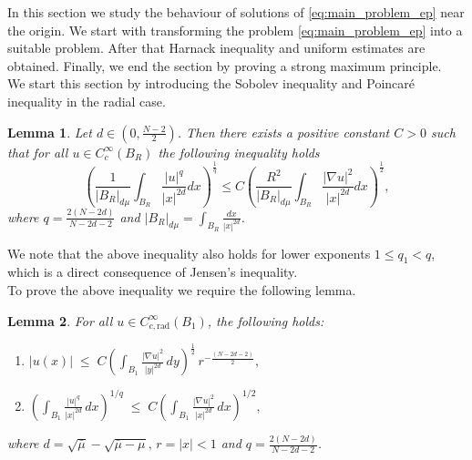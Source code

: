 \documentclass[11pt]{article}
\newtheorem{lemma}{Lemma}[section] %
\newcommand{\al} {\alpha}
\newcommand{\grad}{\nabla}
\begin{document}
In this section we study the behaviour of solutions of \eqref{eq:main_problem_ep} near the origin. We start with transforming the problem \eqref{eq:main_problem_ep} into a suitable problem. After that Harnack inequality and uniform estimates are obtained. Finally, we end the section by proving a strong maximum principle.\\
We start this section by introducing the Sobolev inequality and Poincar\'{e} inequality in the radial case.


\begin{lemma}\label{lem:weighted_sobolev_inequality}
Let $d \in  (0, \frac{N-2}{2})$. Then there exists a positive constant $C>0$ such that for all $u \in C_c^{\infty}(B_R)$ the following inequality holds
\begin{equation*}
        \left( \frac{1}{|B_R|_{d\mu}}\int_{B_R} \frac{|u|^q}{|x|^{2d}} dx\right)^{\frac{1}{q}} \leq C \left( \frac{R^2}{|B_R|_{d \mu}} \int_{B_R} \frac{|\grad u |^2}{|x|^{2d}}dx\right)^{\frac{1}{2}},
\end{equation*}
where $q = \frac{2 (N- 2d)}{N - 2d - 2}$ and $|B_R|_{d \mu} = \int_{B_R} \frac{dx}{|x|^{2d}}$.
\end{lemma}
We note that the above inequality also holds for lower exponents \( 1 \leq q_1 < q \), which is a direct consequence of Jensen's inequality. \\
To prove the above inequality we require the following lemma.
\begin{lemma}\label{lem:radial_estimate}
For all $u \in C_{c, \mathrm{rad}}^{\infty}(B_1)$, the following holds:
\begin{enumerate}
    \item[$(i)$]  $
|u(x)| \;\leq\; C \left( \int_{B_1} \frac{|\nabla u|^2}{|y|^{2d}} \, dy \right)^{\tfrac{1}{2}}
\, r^{-\tfrac{(N-2d-2)}{2}},$
\item[$(ii)$] $
\left( \int_{B_1} \frac{|u|^q}{|x|^{2d}} \, dx \right)^{1/q} 
\;\leq\; C \left( \int_{B_1} \frac{|\nabla u|^2}{|x|^{2d}} \, dx \right)^{1/2},$
\end{enumerate}
where $d = \sqrt{\bar{\mu}} - \sqrt{\bar{\mu} - \mu}, \, r = |x| < 1$ and $q = \frac{2(N-2d)}{N-2d-2}$.
\end{lemma}
\end{document}
